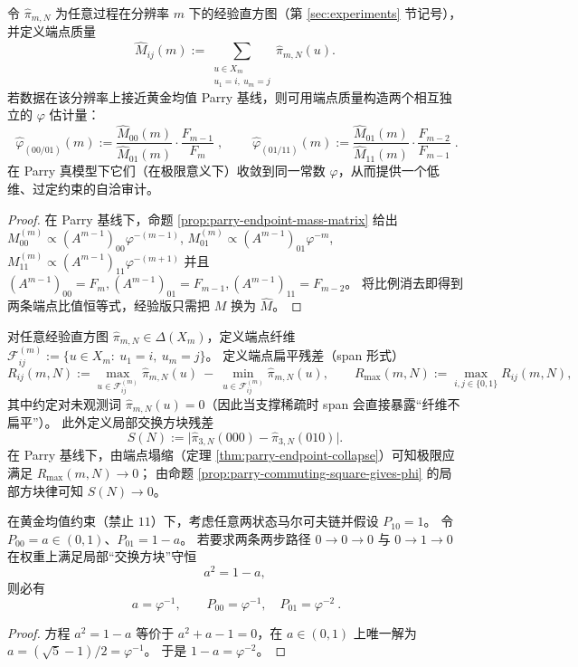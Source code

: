 \begin{corollary}[由端点质量反推出黄金常数的过定约束估计]\label{cor:parry-endpoint-phi-estimators}
令 \(\hat\pi_{m,N}\) 为任意过程在分辨率 \(m\) 下的经验直方图（第 \ref{sec:experiments} 节记号），并定义端点质量
\[
\widehat M_{ij}(m):=\sum_{\substack{u\in X_m\\ u_1=i,\ u_m=j}}\hat\pi_{m,N}(u).
\]
若数据在该分辨率上接近黄金均值 Parry 基线，则可用端点质量构造两个相互独立的 \(\varphi\) 估计量：
\[
\boxed{\;
\widehat\varphi_{(00/01)}(m)
:=\frac{\widehat M_{00}(m)}{\widehat M_{01}(m)}\cdot \frac{F_{m-1}}{F_m}\;},
\qquad
\boxed{\;
\widehat\varphi_{(01/11)}(m)
:=\frac{\widehat M_{01}(m)}{\widehat M_{11}(m)}\cdot \frac{F_{m-2}}{F_{m-1}}\;}.
\]
在 Parry 真模型下它们（在极限意义下）收敛到同一常数 \(\varphi\)，从而提供一个低维、过定约束的自洽审计。
\end{corollary}
\begin{proof}
在 Parry 基线下，命题 \ref{prop:parry-endpoint-mass-matrix} 给出
\(
M^{(m)}_{00}\propto (A^{m-1})_{00}\varphi^{-(m-1)}\),
\(
M^{(m)}_{01}\propto (A^{m-1})_{01}\varphi^{-m}\),
\(
M^{(m)}_{11}\propto (A^{m-1})_{11}\varphi^{-(m+1)}
\)
并且 \((A^{m-1})_{00}=F_m,(A^{m-1})_{01}=F_{m-1},(A^{m-1})_{11}=F_{m-2}\)。
将比例消去即得到两条端点比值恒等式，经验版只需把 \(M\) 换为 \(\widehat M\)。
\end{proof}

\begin{definition}[端点扁平残差与局部交换方块残差]\label{def:endpoint-flatness-square-residue}
对任意经验直方图 \(\hat\pi_{m,N}\in\Delta(X_m)\)，定义端点纤维
\(
\mathcal{F}_{ij}^{(m)}:=\{u\in X_m:\ u_1=i,\ u_m=j\}
\)。
定义端点扁平残差（span 形式）
\[
R_{ij}(m,N):=\max_{u\in \mathcal{F}_{ij}^{(m)}}\hat\pi_{m,N}(u)\ -\ \min_{u\in \mathcal{F}_{ij}^{(m)}}\hat\pi_{m,N}(u),
\qquad
R_{\max}(m,N):=\max_{i,j\in\{0,1\}}R_{ij}(m,N),
\]
其中约定对未观测词 \(\hat\pi_{m,N}(u)=0\)（因此当支撑稀疏时 span 会直接暴露“纤维不扁平”）。
此外定义局部交换方块残差
\[
S(N):=\bigl|\hat\pi_{3,N}(000)-\hat\pi_{3,N}(010)\bigr|.
\]
在 Parry 基线下，由端点塌缩（定理 \ref{thm:parry-endpoint-collapse}）可知极限应满足 \(R_{\max}(m,N)\to 0\)；
由命题 \ref{prop:parry-commuting-square-gives-phi} 的局部方块律可知 \(S(N)\to 0\)。
\end{definition}

\begin{proposition}[局部交换方块 \texorpdfstring{$\Rightarrow$}{=>} 黄金转移概率]\label{prop:parry-commuting-square-gives-phi}
在黄金均值约束（禁止 \(11\)）下，考虑任意两状态马尔可夫链并假设 \(P_{10}=1\)。
令 \(P_{00}=a\in(0,1)\)、\(P_{01}=1-a\)。
若要求两条两步路径 \(0\to0\to0\) 与 \(0\to1\to0\) 在权重上满足局部“交换方块”守恒
\[
a^2=1-a,
\]
则必有
\[
\boxed{\ a=\varphi^{-1},\qquad P_{00}=\varphi^{-1},\quad P_{01}=\varphi^{-2}\ }.
\]
\end{proposition}
\begin{proof}
方程 \(a^2=1-a\) 等价于 \(a^2+a-1=0\)，在 \(a\in(0,1)\) 上唯一解为 \(a=(\sqrt5-1)/2=\varphi^{-1}\)。
于是 \(1-a=\varphi^{-2}\)。
\end{proof}
